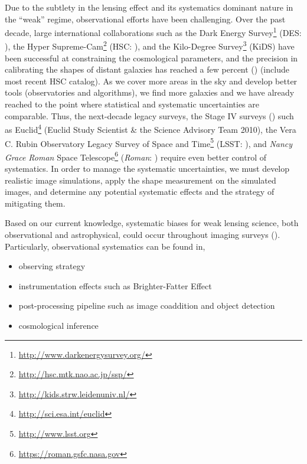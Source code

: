 \documentclass[fleqn,usenatbib]{mnras}
\begin{document}
Due to the subtlety in the lensing effect and its systematics dominant nature in the “weak” regime, observational efforts have been challenging. Over the past decade, large international collaborations such as the Dark Energy Survey\footnote{\url{http://www.darkenergysurvey.org/}} (DES: \citealt{2005astro.ph.10346T}), the Hyper Supreme-Cam\footnote{\url{http://hsc.mtk.nao.ac.jp/ssp/}} (HSC: \citealt{2018PASJ...70S...4A}), and the Kilo-Degree Survey\footnote{\url{http://kids.strw.leidenuniv.nl/}} (KiDS) have been successful at constraining the cosmological parameters, and the precision in calibrating the shapes of distant galaxies has reached a few percent (\citealt{2020arXiv201103408G, 2020arXiv201208567M, 2021A&A...645A.105G}) (include most recent HSC catalog). As we cover more areas in the sky and develop better tools (observatories and algorithms), we find more galaxies and we have already reached to the point where statistical and systematic uncertainties are comparable. Thus, the next-decade legacy surveys, the Stage IV surveys (\citealt{2006astro.ph..9591A}) such as Euclid\footnote{\url{ http://sci.esa.int/euclid}} (Euclid Study Scientist & the Science Advisory Team 2010), the Vera C. Rubin Observatory Legacy Survey of Space and Time\footnote{\url{ http://www.lsst.org}} (LSST: \citealt{2009arXiv0912.0201L, 2019ApJ...873..111I}), and \emph{Nancy Grace Roman} Space Telescope\footnote{\url{https://roman.gsfc.nasa.gov}} (\emph{Roman}: \citealt{2015arXiv150303757S}) require even better control of systematics. In order to manage the systematic uncertainties, we must develop realistic image simulations, apply the shape measurement on the simulated images, and determine any potential systematic effects and the strategy of mitigating them.  


Based on our current knowledge, systematic biases for weak lensing science, both observational and astrophysical, could occur throughout imaging surveys (\citealt{2018ARA&A..56..393M}). Particularly, observational systematics can be found in, 
\begin{itemize}
    \item observing strategy
    \item instrumentation effects such as Brighter-Fatter Effect
    \item post-processing pipeline such as image coaddition and object detection
    \item cosmological inference 
\end{itemize} 
\end{document}
